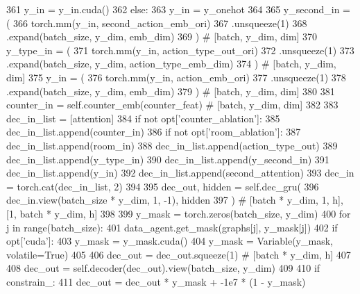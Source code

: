 \begin{DoxyCode}
361                     y\_in = y\_in.cuda()
362             \textcolor{keywordflow}{else}:
363                 y\_in = y\_onehot
364 
365             y\_second\_in = (
366                 torch.mm(y\_in, second\_action\_emb\_ori)
367                 .unsqueeze(1)
368                 .expand(batch\_size, y\_dim, emb\_dim)
369             )  \textcolor{comment}{# [batch, y\_dim, dim]}
370             y\_type\_in = (
371                 torch.mm(y\_in, action\_type\_out\_ori)
372                 .unsqueeze(1)
373                 .expand(batch\_size, y\_dim, action\_type\_emb\_dim)
374             )  \textcolor{comment}{# [batch, y\_dim, dim]}
375             y\_in = (
376                 torch.mm(y\_in, action\_emb\_ori)
377                 .unsqueeze(1)
378                 .expand(batch\_size, y\_dim, emb\_dim)
379             )  \textcolor{comment}{# [batch, y\_dim, dim]}
380 
381             counter\_in = self.counter\_emb(counter\_feat)  \textcolor{comment}{# [batch, y\_dim, dim]}
382 
383             dec\_in\_list = [attention]
384             \textcolor{keywordflow}{if} \textcolor{keywordflow}{not} opt[\textcolor{stringliteral}{'counter\_ablation'}]:
385                 dec\_in\_list.append(counter\_in)
386             \textcolor{keywordflow}{if} \textcolor{keywordflow}{not} opt[\textcolor{stringliteral}{'room\_ablation'}]:
387                 dec\_in\_list.append(room\_in)
388             dec\_in\_list.append(action\_type\_out)
389             dec\_in\_list.append(y\_type\_in)
390             dec\_in\_list.append(y\_second\_in)
391             dec\_in\_list.append(y\_in)
392             dec\_in\_list.append(second\_attention)
393             dec\_in = torch.cat(dec\_in\_list, 2)
394 
395             dec\_out, hidden = self.dec\_gru(
396                 dec\_in.view(batch\_size * y\_dim, 1, -1), hidden
397             )  \textcolor{comment}{# [batch * y\_dim, 1, h], [1, batch * y\_dim, h]}
398 
399             y\_mask = torch.zeros(batch\_size, y\_dim)
400             \textcolor{keywordflow}{for} j \textcolor{keywordflow}{in} range(batch\_size):
401                 data\_agent.get\_mask(graphs[j], y\_mask[j])
402             \textcolor{keywordflow}{if} opt[\textcolor{stringliteral}{'cuda'}]:
403                 y\_mask = y\_mask.cuda()
404             y\_mask = Variable(y\_mask, volatile=\textcolor{keyword}{True})
405 
406             dec\_out = dec\_out.squeeze(1)  \textcolor{comment}{# [batch * y\_dim, h]}
407 
408             dec\_out = self.decoder(dec\_out).view(batch\_size, y\_dim)
409 
410             \textcolor{keywordflow}{if} constrain\_:
411                 dec\_out = dec\_out * y\_mask + -1e7 * (1 - y\_mask)

\end{DoxyCode}
